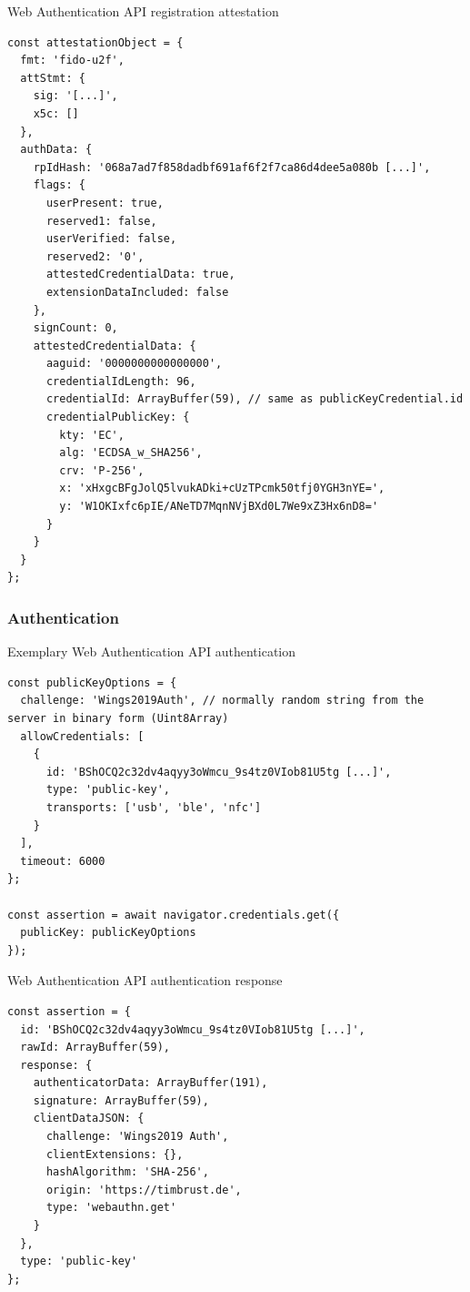 \begin{example}{Web Authentication API registration attestation}
\begin{verbatim}
const attestationObject = {
  fmt: 'fido-u2f',
  attStmt: {
    sig: '[...]',
    x5c: []
  },
  authData: {
    rpIdHash: '068a7ad7f858dadbf691af6f2f7ca86d4dee5a080b [...]',
    flags: {
      userPresent: true,
      reserved1: false,
      userVerified: false,
      reserved2: '0',
      attestedCredentialData: true,
      extensionDataIncluded: false
    },
    signCount: 0,
    attestedCredentialData: {
      aaguid: '0000000000000000',
      credentialIdLength: 96,
      credentialId: ArrayBuffer(59), // same as publicKeyCredential.id
      credentialPublicKey: {
        kty: 'EC',
        alg: 'ECDSA_w_SHA256',
        crv: 'P-256',
        x: 'xHxgcBFgJolQ5lvukADki+cUzTPcmk50tfj0YGH3nYE=',
        y: 'W1OKIxfc6pIE/ANeTD7MqnNVjBXd0L7We9xZ3Hx6nD8='
      }
    }
  }
};
\end{verbatim}
\label{listing:webauthn_reg_resp_attestation}
\end{example}

\subsubsection{Authentication}

\begin{example}{Exemplary Web Authentication API authentication}
\begin{verbatim}
const publicKeyOptions = {
  challenge: 'Wings2019Auth', // normally random string from the server in binary form (Uint8Array)
  allowCredentials: [
    {
      id: 'BShOCQ2c32dv4aqyy3oWmcu_9s4tz0VIob81U5tg [...]',
      type: 'public-key',
      transports: ['usb', 'ble', 'nfc']
    }
  ],
  timeout: 6000
};

const assertion = await navigator.credentials.get({
  publicKey: publicKeyOptions
});
\end{verbatim}
\label{listing:webauthn_auth}
\end{example}

\begin{example}{Web Authentication API authentication response}
\begin{verbatim}
const assertion = {
  id: 'BShOCQ2c32dv4aqyy3oWmcu_9s4tz0VIob81U5tg [...]',
  rawId: ArrayBuffer(59),
  response: {
    authenticatorData: ArrayBuffer(191),
    signature: ArrayBuffer(59),
    clientDataJSON: {
      challenge: 'Wings2019 Auth',
      clientExtensions: {},
      hashAlgorithm: 'SHA-256',
      origin: 'https://timbrust.de',
      type: 'webauthn.get'
    }
  },
  type: 'public-key'
};
\end{verbatim}
\label{listing:webauthn_auth_resp}
\end{example}